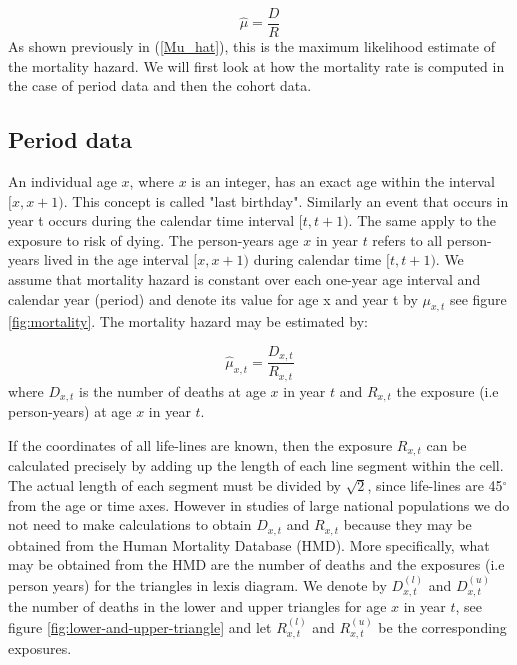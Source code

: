         \begin{equation}
          \hat{\mu} = \frac{D}{R}
          \label{mortality rate}
        \end{equation}
As shown previously in (\ref{Mu_hat}), this is the maximum likelihood estimate of the mortality hazard. 
We will first look at how the mortality rate is computed in the case of period data and then the cohort data.

\subsection{Period data}

An individual age $x$, where $x$ is an integer, has an exact age within the interval $[x, x+1)$. This concept is called "last birthday". 
Similarly an event that occurs in year t occurs during the calendar time interval $[t, t+1)$. 
The same apply to the exposure to risk of dying. The person-years age $x$ in year $t$ refers to all person-years lived in the age interval $[x, x+1)$ during calendar time $[t, t+1)$.
We assume that mortality hazard is constant over each one-year age interval and calendar year (period) and denote its value for age x and year t by ${\mu}_{x,t}$ see figure \ref{fig:mortality}.
The mortality hazard may be estimated by:

        \begin{equation}
          \hat{\mu}_{x,t}= 
          \frac{{D}_{x,t}}{{R}_{x,t}}
        \end{equation}
where ${D}_{x,t}$ is the number of deaths at age $x$ in year $t$ and ${R}_{x,t}$ the exposure (i.e person-years) at age $x$ in year $t$.  

If the coordinates of all life-lines are known, then the exposure  ${R}_{x,t}$ can be calculated precisely by adding up the length of each line segment within the cell. The actual length of each segment must be divided by $\sqrt{2}$, since life-lines are 45$^\circ$ from the age or time axes.
However in studies of large national populations we do not need to make calculations to obtain ${D}_{x,t}$ and ${R}_{x,t}$ because they may be obtained from the Human Mortality Database (HMD).
More specifically, what may be obtained from the HMD are the number of deaths and the exposures (i.e person years) for the triangles in lexis diagram.
We denote by ${D}_{x,t}^{(l)}$ and ${D}_{x,t}^{(u)}$ the number of deaths in the lower and upper triangles for age $x$ in year $t$, see figure \ref{fig:lower-and-upper-triangle}
and let ${R}_{x,t}^{(l)}$ and ${R}_{x,t}^{(u)}$ be the corresponding exposures.

